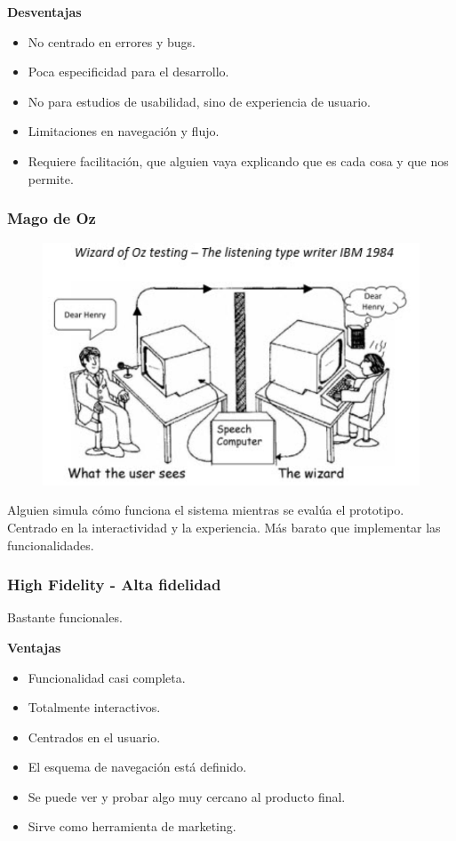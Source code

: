 \documentclass[12pt]{report} %
\begin{document}
  \textbf{Desventajas}
  \begin{itemize}
    \item No centrado en errores y bugs.
    \item Poca especificidad para el desarrollo.
    \item No para estudios de usabilidad, sino de experiencia de usuario.
    \item Limitaciones en navegación y flujo.
    \item Requiere facilitación, que alguien vaya explicando que es cada cosa y que nos permite.
  \end{itemize}
  
  \subsubsection{Mago de Oz}

  \begin{figure}[H]
    {\includegraphics[scale=.4]{2021-03-20 23_48_56-L5.pdf - Foxit Reader.png}}
  \end{figure}

  Alguien simula cómo funciona el sistema mientras se evalúa el prototipo. Centrado en la interactividad y la experiencia. Más barato que implementar las funcionalidades.

  \subsubsection{High Fidelity - Alta fidelidad}
  Bastante funcionales.

  \textbf{Ventajas}
  \begin{itemize}
    \item Funcionalidad casi completa.
    \item Totalmente interactivos.
    \item Centrados en el usuario.
    \item El esquema de navegación está definido.
    \item Se puede ver y probar algo muy cercano al producto final.
    \item Sirve como herramienta de marketing.
  \end{itemize}
\end{document}
